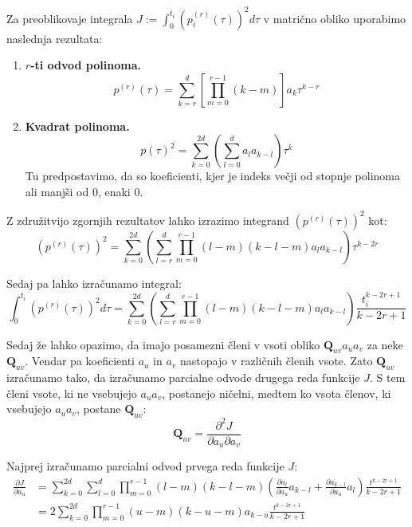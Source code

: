 \documentclass[mat2, tisk]{fmfdelo}
\newcommand{\qmat}{\mathbf{Q}}
\begin{document}
Za preoblikovaje integrala $J := \int_0^{t_i} (p_i^{(r)}(\tau))^2 d\tau$ v matrično obliko uporabimo naslednja rezultata:
\begin{enumerate}
    \item \textbf{$r$-ti odvod polinoma.}
\begin{equation}
    p^{(r)}(\tau) = \sum_{k=r}^{d} \left[\prod_{m=0}^{r-1} (k-m)\right]a_{k} \tau^{k-r}
\end{equation}
    \item \textbf{Kvadrat polinoma.}
    \begin{equation}
        p(\tau)^2 = \sum_{k=0}^{2d} \left( \sum_{l=0}^{d} a_l a_{k-l} \right) \tau^k
    \end{equation}
    Tu predpostavimo, da so koeficienti, kjer je indeks večji od stopnje polinoma ali manjši od 0, enaki 0.
\end{enumerate}

Z združitvijo zgornjih rezultatov lahko izrazimo integrand $(p^{(r)}(\tau))^2$ kot:
\begin{equation}
    (p^{(r)}(\tau))^2 = \sum_{k=0}^{2d} \left( \sum_{l=r}^{d} \prod_{m=0}^{r-1} (l-m)(k-l-m) a_l a_{k-l} \right) \tau^{k-2r}
\end{equation}

Sedaj pa lahko izračunamo integral:
\begin{equation}
    \int_0^{t_i} (p^{(r)}(\tau))^2 d\tau = \sum_{k=0}^{2d} \left( \sum_{l=r}^{d} \prod_{m=0}^{r-1} (l-m)(k-l-m) a_l a_{k-l} \right) \frac{t_i^{k-2r+1}}{k-2r+1}
\end{equation}

Sedaj že lahko opazimo, da imajo posamezni členi v vsoti obliko $\qmat_{uv} a_u a_v$ za neke $\qmat_{uv}$. Vendar pa koeficienti $a_u$ in $a_v$ nastopajo v različnih členih vsote. Zato $\qmat_{uv}$ izračunamo tako, da izračunamo parcialne odvode drugega reda funkcije $J$. S tem členi vsote, ki ne vsebujejo $a_u a_v$, postanejo ničelni, medtem ko vsota členov, ki vsebujejo $a_u a_v$, postane $\qmat_{uv}$:
\begin{equation}
    \qmat_{uv} = \frac{\partial^2 J}{\partial a_u \partial a_v}
\end{equation}

Najprej izračunamo parcialni odvod prvega reda funkcije $J$:
\begin{equation}
    \begin{aligned}
    \frac{\partial J}{\partial a_u} &= \sum_{k=0}^{2d} \sum_{l=0}^{d} \prod_{m=0}^{r-1} (l-m)(k-l-m) \left(\frac{\partial a_l}{\partial a_u} a_{k-l} + \frac{\partial a_{k-l}}{\partial a_u} a_l \right) \frac{t^{k-2r+1}}{k-2r+1}\\
    &= 2\sum_{k=0}^{2d} \prod_{m=0}^{r-1} (u-m)(k-u-m) a_{k-u} \frac{t^{k-2r+1}}{k-2r+1}
\end{aligned}
\end{equation}
\end{document}
